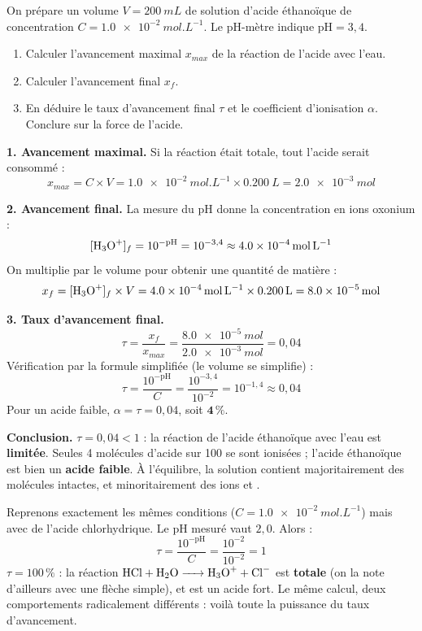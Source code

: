 \documentclass[11pt]{article}
\begin{document}
\begin{exoresolu}
On prépare un volume $V = \SI{200}{mL}$ de solution d'acide éthanoïque de concentration $C = \SI{1,0e-2}{mol.L^{-1}}$. Le pH-mètre indique $\text{pH} = 3{,}4$.
\begin{enumerate}
\item Calculer l'avancement maximal $x_{max}$ de la réaction de l'acide avec l'eau.
\item Calculer l'avancement final $x_f$.
\item En déduire le taux d'avancement final $\tau$ et le coefficient d'ionisation $\alpha$. Conclure sur la force de l'acide.
\end{enumerate}
\tcblower
\textbf{1. Avancement maximal.} Si la réaction était totale, tout l'acide serait consommé :
\[ x_{max} = C \times V = \SI{1,0e-2}{mol.L^{-1}} \times \SI{0,200}{L} = \SI{2,0e-3}{mol} \]

\textbf{2. Avancement final.} La mesure du pH donne la concentration en ions oxonium :
\[ [\ce{H3O+}]_f = 10^{-\text{pH}} = 10^{-3{,}4} \approx \SI{4,0e-4}{mol.L^{-1}} \]
On multiplie par le volume pour obtenir une quantité de matière :
\[ x_f = [\ce{H3O+}]_f \times V = \SI{4,0e-4}{mol.L^{-1}} \times \SI{0,200}{L} = \SI{8,0e-5}{mol} \]

\textbf{3. Taux d'avancement final.}
\[ \tau = \frac{x_f}{x_{max}} = \frac{\SI{8,0e-5}{mol}}{\SI{2,0e-3}{mol}} = 0{,}04 \]
Vérification par la formule simplifiée (le volume se simplifie) :
\[ \tau = \frac{10^{-\text{pH}}}{C} = \frac{10^{-3{,}4}}{10^{-2}} = 10^{-1{,}4} \approx 0{,}04 \]
Pour un acide faible, $\alpha = \tau = 0{,}04$, soit $\mathbf{4\,\%}$.

\textbf{Conclusion.} $\tau = 0{,}04 < 1$ : la réaction de l'acide éthanoïque avec l'eau est \textbf{limitée}. Seules 4 molécules d'acide sur 100 se sont ionisées ; l'acide éthanoïque est bien un \textbf{acide faible}. À l'équilibre, la solution contient majoritairement des molécules  intactes, et minoritairement des ions  et .
\end{exoresolu}

\begin{exemplebox}
Reprenons exactement les mêmes conditions ($C = \SI{1,0e-2}{mol.L^{-1}}$) mais avec de l'acide chlorhydrique. Le pH mesuré vaut $2{,}0$. Alors :
\[ \tau = \frac{10^{-\text{pH}}}{C} = \frac{10^{-2}}{10^{-2}} = 1 \]
$\tau = 100\,\%$ : la réaction $\ce{HCl + H2O -> H3O+ + Cl-}$ est \textbf{totale} (on la note d'ailleurs avec une flèche simple), et  est un acide fort. Le même calcul, deux comportements radicalement différents : voilà toute la puissance du taux d'avancement.
\end{exemplebox}
\end{document}
